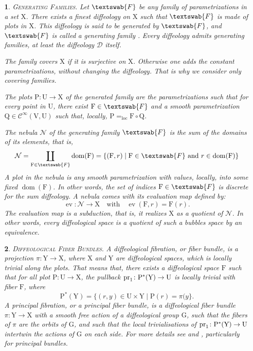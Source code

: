 \documentclass[12pt,reqno]{amsart}
\theoremstyle{article}
\newtheorem{article}{}
\def\artlabel[#1]{\textsc{#1}.}
\def \F{\mathrm F}
\def \G{\mathrm G}
\def \P{\mathrm P}
\def \Q{\mathrm Q}
\def \U{\mathrm U}
\def \V{\mathrm V}
\def \X{\mathrm X}
\def \Y{\mathrm Y}
\newcommand{\cD}{{\mathcal D}}
\newcommand{\cN}{\mathcal{N}}
\newcommand{\fF}{\textswab{F}}
\newcommand{\Cinfty}{{\mathcal C}^{\infty}}
\DeclareMathOperator{\dom}{dom}
\DeclareMathOperator{\ev}{ev}
\newcommand{\loc}{\text{loc}}
\newcommand{\pr}{{\rm pr}}
\begin{document}
  \begin{article}\artlabel[Generating Families]
    Let $\fF$ be any family of parametrizations in a set $\X$.
    There exists a finest diffeology on $\X$ such that $\fF$ is made of plots in $\X$.
    This diffeology is said to be \emph{generated} by $\fF$,
    and $\fF$ is called a \emph{generating family}  \cite{Igl85}.
    Every diffeology admits generating families,
    at least the diffeology $\cD$ itself.
    
    The family \emph{covers} $\X$ if it is surjective on $\X$.
    Otherwise one adds the constant parametrizations, without changing the diffeology.
    That is why we consider only covering families.
    
    The plots $\P \colon \U \to \X$ of the generated family are the parametrizations such that for every point in $\U$,
    there exist $\F \in \fF$ and a smooth parametrization $\Q \in \Cinfty(\V,\U)$ such that,
    locally,
    $\P =_\loc \F \circ \Q$.
    
    The \emph{nebula} $\cN$ of the generating family $\fF$ is the sum of the domains of its elements,
    that is,
    $$
    \cN = \coprod_{\F \in \fF} \dom(\F) = \{ (\F, r) \mid \F \in \fF \text{ and } r \in \dom(\F) \}
    $$
    A plot in the nebula is any smooth parametrization with values,
    locally,
    into some fixed $\dom(\F)$.
    In other words,
    the set of indices $\F \in \fF$ is discrete for the sum diffeology.
    A nebula comes with its \emph{evaluation map} defined by:
    $$
    \ev \colon \cN \to \X
    \quad \text{with} \quad
    \ev(\F,r) = \F(r).
    $$
    The evaluation map is a subduction,
    that is,
    it realizes $\X$ as a quotient of $\cN$.
    In other words,
    every diffeological space is a quotient of such a \emph{bubbles space} by an equivalence.
  \end{article}
  
  \begin{article}\artlabel[Diffeological Fiber Bundles]
    A \emph{diffeological fibration},
    or \emph{fiber bundle},
    is a projection $\pi \colon \Y \to \X$,
    where $\X$ and $\Y$ are diffeological spaces,
    which is \emph{locally trivial along the plots}.
    That means that,
    there exists a diffeological space $\F$ such that for all plot $\P \colon \U \to \X$,
    the pullback $\pr_1 \colon \P^*(\Y) \to \U$ is locally trivial with fiber $\F$,
    where
    $$
    \P^*(\Y) = \{ (r,y) \in \U \times \Y \mid \P(r) = \pi(y \}.
    $$
    A \emph{principal fibration},
    or a \emph{principal fiber bundle},
    is a diffeological fiber bundle $\pi \colon \Y \to \X$ with a smooth free action of a diffeological group $\G$,
    such that the fibers of $\pi$ are the orbits of $\G$,
    and such that the local trivialisations of $\pr_1 \colon \P^*(\Y) \to \U$ intertwin the actions of $\G$ on each side.
    For more details see \cite{Igl85} and \cite{PIZ13},
    particularly \cite[ 8.13]{PIZ13} for principal bundles.
  \end{article}
  
\end{document}
